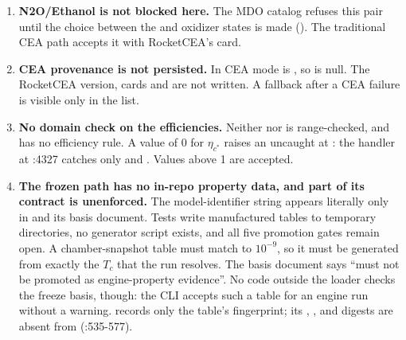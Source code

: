 \begin{enumerate}
\item \textbf{N2O/Ethanol is not blocked here.} The MDO catalog refuses this pair until the choice between the  and  oxidizer states is made (). The traditional CEA path accepts it with RocketCEA's  card.
\item \textbf{CEA provenance is not persisted.} In CEA mode  is , so  is null. The RocketCEA version, cards and  are not written. A fallback after a CEA failure is visible only in the  list.
\item \textbf{No domain check on the efficiencies.} Neither  nor  is range-checked, and  has no efficiency rule. A value of 0 for $\eta_{c^*}$ raises an uncaught  at : the handler at :4327 catches only  and . Values above 1 are accepted.
\item \textbf{The frozen path has no in-repo property data, and part of its contract is unenforced.} The model-identifier string appears literally only in  and its basis document. Tests write manufactured tables to temporary directories, no generator script exists, and all five promotion gates remain open. A chamber-snapshot table must match  to $10^{-9}$, so it must be generated from exactly the $T_c$ that the run resolves. The basis document says  ``must not be promoted as engine-property evidence''. No code outside the loader checks the freeze basis, though: the CLI accepts such a table for an engine run without a warning.  records only the table's fingerprint; its , ,  and digests are absent from  (:535-577).
\end{enumerate}


